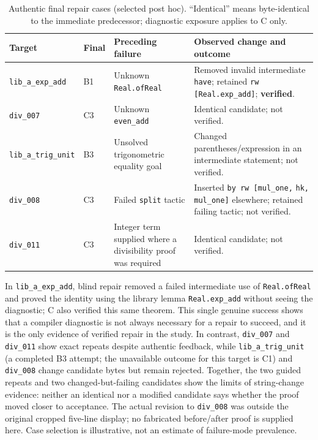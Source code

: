 \documentclass[runningheads,a4paper]{llncs}
\begin{document}
\begin{table}[tbp]
\caption{Authentic final repair cases (selected post hoc). ``Identical'' means
byte-identical to the immediate predecessor; diagnostic exposure applies to C only.}
\label{tab:cases}
\centering\footnotesize\setlength{\tabcolsep}{4pt}
\begin{tabular}{p{2.3cm}p{1.0cm}p{3.2cm}p{4.0cm}}
\toprule
Target & Final & Preceding failure & Observed change and outcome\\
\midrule
\texttt{lib\_a\_exp\_add} & B1 & Unknown \texttt{Real.ofReal} & Removed invalid intermediate \texttt{have}; retained \texttt{rw [Real.exp\_add]}; \textbf{verified}.\\
\texttt{div\_007} & C3 & Unknown \texttt{even\_add} & Identical candidate; not verified.\\
\texttt{lib\_a\_trig\_}\allowbreak\texttt{unit} & B3 & Unsolved trigonometric equality goal & Changed parentheses/expression in an intermediate statement; not verified.\\
\texttt{div\_008} & C3 & Failed \texttt{split} tactic & Inserted \texttt{by rw [mul\_one,} \texttt{hk, mul\_one]} elsewhere; retained failing tactic; not verified.\\
\texttt{div\_011} & C3 & Integer term supplied where a divisibility proof was required & Identical candidate; not verified.\\
\bottomrule
\end{tabular}
\end{table}

In \texttt{lib\_a\_exp\_add}, blind repair removed a failed intermediate
use of \texttt{Real.ofReal} and proved the identity using the library lemma
\texttt{Real.exp\_add} without seeing the diagnostic; C also verified this same
theorem. This single genuine success shows that a compiler diagnostic is not always
necessary for a repair to succeed, and it is the only evidence of verified repair
in the study. In contrast, \texttt{div\_007} and \texttt{div\_011} show exact repeats
despite authentic feedback, while \texttt{lib\_a\_trig\_unit} (a completed B3
attempt; the unavailable outcome for this target is C1) and
\texttt{div\_008} change candidate bytes but remain rejected. Together, the two guided
repeats and two changed-but-failing candidates show the limits of string-change
evidence: neither an identical nor a modified candidate says whether the proof
moved closer to acceptance. The actual
revision to \texttt{div\_008} was outside the original cropped five-line display;
no fabricated before/after proof is supplied here. Case selection is
illustrative, not an estimate of failure-mode prevalence.
\end{document}
